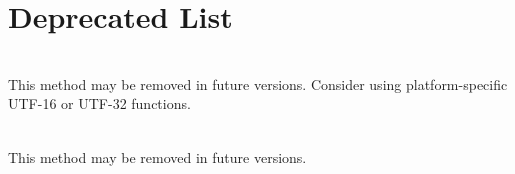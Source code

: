 \chapter{Deprecated List}
\hypertarget{deprecated}{}\label{deprecated}

\begin{DoxyRefList}
\item[Member \doxylink{classUniConv_afa8f9233e056613a901c92f51bf39c01}{Uni\+Conv\+::Utf8\+Convert\+To\+Wide} (const std\+::string \&s\+Input)]\hfill \\
\label{deprecated__deprecated000001}%
%
This method may be removed in future versions. Consider using platform-\/specific UTF-\/16 or UTF-\/32 functions. 
\item[Member \doxylink{classUniConv_a4995584f94b47501d4760e40144d5a3c}{Uni\+Conv\+::Utf8\+Convert\+To\+Wide} (const char \texorpdfstring{$\ast$}{*}s\+Input)]\hfill \\
\label{deprecated__deprecated000002}%
%
This method may be removed in future versions. 
\end{DoxyRefList}